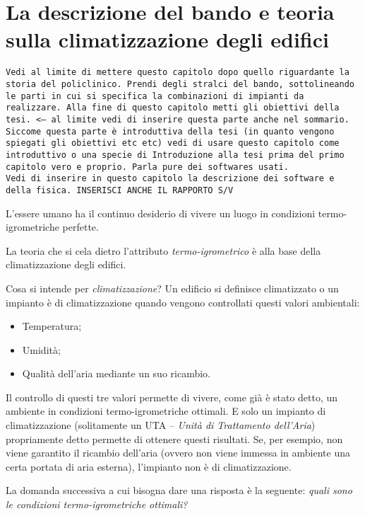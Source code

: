 \chapter{La descrizione del bando e teoria sulla climatizzazione degli edifici}
\thispagestyle{empty}
\texttt{Vedi al limite di mettere questo capitolo dopo quello riguardante la storia del policlinico.
	Prendi degli stralci del bando, sottolineando le parti in cui si specifica la combinazioni di impianti da realizzare. 
	Alla fine di questo capitolo metti gli obiettivi della tesi. <-- al limite vedi di inserire questa parte anche nel sommario. Siccome questa parte è introduttiva della tesi (in quanto vengono spiegati gli obiettivi etc etc) vedi di usare questo capitolo come introduttivo o una specie di Introduzione alla tesi prima del primo capitolo vero e proprio.
	Parla pure dei softwares usati.\\ Vedi di inserire in questo capitolo la descrizione dei software e della fisica. INSERISCI ANCHE IL RAPPORTO S/V}\\
\vspace{2cm}

L'essere umano ha il continuo desiderio di vivere un luogo in condizioni termo-igrometriche perfette. 

La teoria che si cela dietro l'attributo \emph{termo-igrometrico} è alla base della climatizzazione degli edifici.

Cosa si intende per \emph{climatizzazione}? Un edificio si definisce climatizzato o un impianto è di climatizzazione quando vengono controllati questi valori ambientali:
\begin{itemize}
	\item Temperatura;
	\item Umidità;
	\item Qualità dell'aria mediante un suo ricambio.
\end{itemize}
Il controllo di questi tre valori permette di vivere, come già è stato detto, un ambiente in condizioni termo-igrometriche ottimali. E solo un impianto di climatizzazione (solitamente un UTA -- \emph{Unità di Trattamento dell'Aria}) propriamente detto permette di ottenere questi risultati. Se, per esempio, non viene garantito il ricambio dell'aria (ovvero non viene immessa in ambiente una certa portata di aria esterna), l'impianto non è di climatizzazione.

La domanda successiva a cui bisogna dare una risposta è la seguente: \emph{quali sono le condizioni termo-igrometriche ottimali?}

